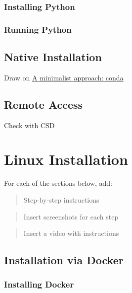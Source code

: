 \documentclass[
]{book}
\begin{document}
\hypertarget{installing-python}{%
\subsection{Installing Python}\label{installing-python}}

\hypertarget{running-python}{%
\subsection{Running Python}\label{running-python}}

\hypertarget{native-installation}{%
\section{Native Installation}\label{native-installation}}

Draw on \href{http://darribas.org/gds19/software.html}{A minimalist approach: conda}

\hypertarget{remote-access}{%
\section{Remote Access}\label{remote-access}}

Check with CSD

\hypertarget{linux}{%
\chapter{Linux Installation}\label{linux}}

For each of the sections below, add:

\begin{quote}
Step-by-step instructions
\end{quote}

\begin{quote}
Insert screenshots for each step
\end{quote}

\begin{quote}
Insert a video with instructions
\end{quote}

\hypertarget{installation-via-docker}{%
\section{Installation via Docker}\label{installation-via-docker}}

\hypertarget{installing-docker}{%
\subsection{Installing Docker}\label{installing-docker}}
\end{document}
